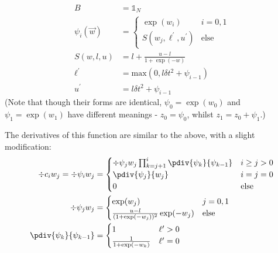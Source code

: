 \documentclass[]{article}
\begin{document}
				\begin{align}
					B & = \mathds{1}_N
					\\
					\psi_i(\vec{w}) & = \begin{cases}
						\exp(w_i) & i = 0,1
						\\ 
						S(w_j,\ell^\prime,u^\prime) & \text{else}
					\end{cases}
					\\
					S(w,l,u) & = l + \frac{u- l}{1 + \exp(-w)}
					\\
					\ell^\prime &= \text{max}(0,l \delta t^2 + \psi_{i-1})
					\\
					u^\prime & = l \delta t^2 + \psi_{i-1}
				\end{align}
				(Note that though their forms are identical, $\psi_0 = \exp(w_0)$ and $\psi_1 = \exp(w_1)$ have different meanings - $z_0 = \psi_0$, whilst $z_1 = z_0 + \psi_1$.)

				The derivatives of this function are similar to the above, with a slight modification:
				\begin{align}
					\div{c_i}{w_j} = \div{\psi_i}{w_j} & = \begin{cases} 
						\div{\psi_j}{w_j} \prod_{k = j+1}^i \pdiv{\psi_k}{\psi_{k-1}} & i\geq j > 0
						\\
						\pdiv{\psi_j}{w_j} & i=j=0
						\\
						0 &\text{else}
					\end{cases}
					\\
					\div{\psi_j}{w_j} & = \begin{cases} \exp(w_j) & j = 0,1
						\\
						\frac{u - l}{(1 + \exp(-w_j))^2} \exp(-w_j) & \text{else}
					\end{cases}
					\\
					\pdiv{\psi_k}{\psi_{k-1}} & = \begin{cases} 1 & \ell^\prime > 0
						\\
						\frac{1}{1 + \exp(-w_k)} & \ell^\prime = 0\end{cases}
				\end{align}
\end{document}
